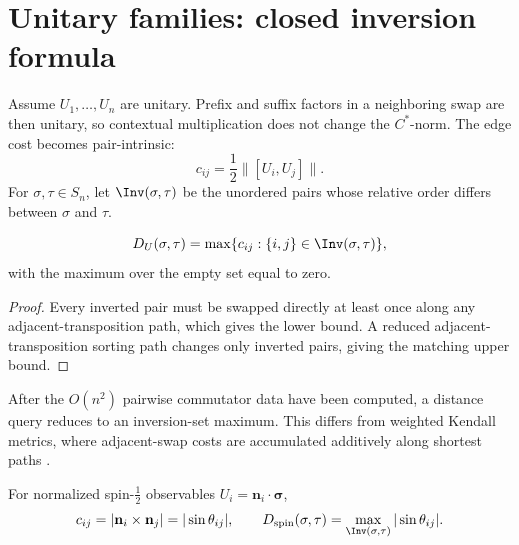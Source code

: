 \section{Unitary families: closed inversion formula}
Assume $U_1,\dots,U_n$ are unitary. Prefix and suffix factors in a neighboring swap are then unitary, so contextual multiplication does not change the $C^*$-norm. The edge cost becomes pair-intrinsic:
\begin{equation}\label{eq:cij}
c_{ij}=\frac12\|[U_i,U_j]\|.
\end{equation}
For $\sigma,\tau\in S_n$, let $\Inv(\sigma,\tau)$ be the unordered pairs whose relative order differs between $\sigma$ and $\tau$.

\begin{theorem}\label{thm:inversion}
\begin{equation}\label{eq:inversion}
D_U(\sigma,\tau)=\max\{c_{ij}:\{i,j\}\in\Inv(\sigma,\tau)\},
\end{equation}
with the maximum over the empty set equal to zero.
\end{theorem}
\begin{proof}
Every inverted pair must be swapped directly at least once along any adjacent-transposition path, which gives the lower bound. A reduced adjacent-transposition sorting path changes only inverted pairs, giving the matching upper bound.
\end{proof}

After the $O(n^2)$ pairwise commutator data have been computed, a distance query reduces to an inversion-set maximum. This differs from weighted Kendall metrics, where adjacent-swap costs are accumulated additively along shortest paths \cite{ref7,ref17}.

For normalized spin-$\tfrac12$ observables $U_i=\mathbf n_i\cdot\boldsymbol\sigma$,
\begin{equation}\label{eq:spinweight}
c_{ij}=|\mathbf n_i\times\mathbf n_j|=|\sin\theta_{ij}|,
\qquad
D_{\mathrm{spin}}(\sigma,\tau)=\max_{\Inv(\sigma,\tau)}|\sin\theta_{ij}|.
\end{equation}
